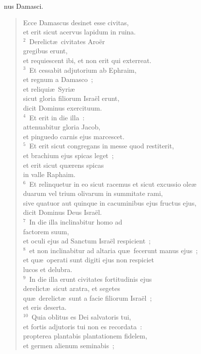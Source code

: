 \bchapter
{}nus Damasci. \begin{verse}Ecce Damascus desinet esse civitas,\\ et erit sicut acervus lapidum in ruina.\\
${}^{2}$~Derelict\ae\ civitates Aro\"er\\ gregibus erunt,\\ et requiescent ibi, et non erit qui exterreat.\\
${}^{3}$~Et cessabit adjutorium ab Ephraim,\\ et regnum a Damasco~;\\ et reliqui\ae\ Syri\ae \\ sicut gloria filiorum Isra\"el erunt,\\ dicit Dominus exercituum.\\
${}^{4}$~Et erit in die illa~:\\ attenuabitur gloria Jacob,\\ et pinguedo carnis ejus marcescet.\\
${}^{5}$~Et erit sicut congregans in messe quod restiterit,\\ et brachium ejus spicas leget~;\\ et erit sicut qu\ae rens spicas\\ in valle Raphaim.\\
${}^{6}$~Et relinquetur in eo sicut racemus et sicut excussio ole\ae \\ duarum vel trium olivarum in summitate rami,\\ sive quatuor aut quinque in cacuminibus ejus fructus ejus,\\ dicit Dominus Deus Isra\"el.\\
${}^{7}$~In die illa inclinabitur homo ad\\ factorem suum,\\ et oculi ejus ad Sanctum Isra\"el respicient~;\\
${}^{8}$~et non inclinabitur ad altaria qu\ae\ fecerunt manus ejus~;\\ et qu\ae\ operati sunt digiti ejus non respiciet\\ lucos et delubra.\\
${}^{9}$~In die illa erunt civitates fortitudinis ejus\\ derelict\ae\ sicut aratra, et segetes\\ qu\ae\ derelict\ae\ sunt a facie filiorum Isra\"el~;\\ et eris deserta.\\
${}^{10}$~Quia oblitus es Dei salvatoris tui,\\ et fortis adjutoris tui non es recordata~:\\ propterea plantabis plantationem fidelem,\\ et germen alienum seminabis~;\\

\end{verse}
